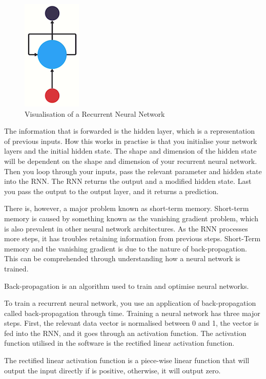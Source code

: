 \begin{figure}[H]
    \centering
    \includegraphics[width=.2\linewidth]{Images/rnn.png}
    \caption{Visualisation of a Recurrent Neural Network}
\end{figure}

The information that is forwarded is the hidden layer, which is a representation of previous inputs. How this works in practise is that you initialise your network layers and the initial hidden state. The shape and dimension of the hidden state will be dependent on the shape and dimension of your recurrent neural network. Then you loop through your inputs, pass the relevant parameter and hidden state into the RNN. The RNN returns the output and a modified hidden state. Last you pass the output to the output layer, and it returns a prediction. 

There is, however, a major problem known as short-term memory. Short-term memory is caused by something known as the vanishing gradient problem, which is also prevalent in other neural network architectures. As the RNN processes more steps, it has troubles retaining information from previous steps. Short-Term memory and the vanishing gradient is due to the nature of back-propagation. This can be comprehended through understanding how a neural network is trained\cite{intro_rnn}.

\begin{definition}
Back-propagation is an algorithm used to train and optimise neural networks.
\end{definition}

To train a recurrent neural network, you use an application of back-propagation called back-propagation through time. Training a neural network has three major steps. First, the relevant data vector is normalised between 0 and 1, the vector is fed into the RNN, and it goes through an activation function. The activation function utilised in the software is the rectified linear activation function\cite{lstm_rnn}. 

\begin{definition}
The rectified linear activation function is a piece-wise linear function that will output the input directly if is positive, otherwise, it will output zero.
\end{definition}

